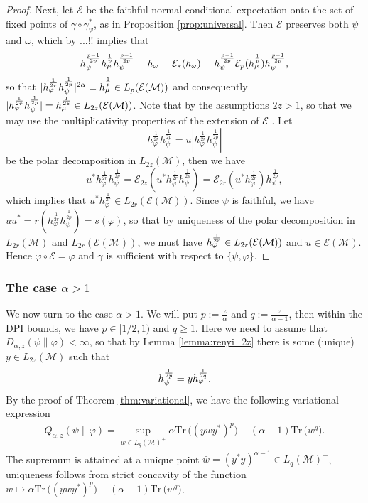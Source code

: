 \documentclass[12pt]{article}
\theoremstyle{definition}
\theoremstyle{remark}
\numberwithin{equation}{section}
\def\cE{\mathcal E}
\def\Me{\mathcal M}
\def \Tr{\mathrm{Tr}\,}
\def\ffi{\varphi}
\begin{document}
\begin{proof}
Next, let $\mathcal E$ be the faithful  normal conditional expectation onto the
set of fixed points of $\gamma\circ\gamma^*_\psi$, as in Proposition \ref{prop:universal}. Then
$\mathcal E$ preserves both $\psi$ and $\omega$, which by
\cite{junge2003noncommutative} {\color{red}...!!}  implies that 
\[
h_\psi^{p-1\over 2p}h_\mu^{\frac1p}h_\psi^{p-1\over 2p}=h_\omega=\mathcal
E_*(h_\omega)=h_\psi^{p-1\over 2p}\cE_p(h_\mu^{\frac1p})h_\psi^{p-1\over 2p},
\]
so that $|h_\ffi^{1\over 2r}h_\psi^{1\over 2p}|^{2\alpha}= h_\mu^{\frac1p}\in
L_p(\cE(\Me))$ and consequently $|h_\varphi^{\frac1{2r}}h_\psi^{\frac1{2p}}|=h_\mu^{1\over
2z}\in L_{2z}(\mathcal E(\Me))$.
Note that by the assumptions $2z>1$, so that we may use the multiplicativity properties
of the extension of $\mathcal E$ \cite{junge2003noncommutative}. Let 
\[
h_\varphi^{\frac1{2r}}h_\psi^{\frac1{2p}}=u|h_\varphi^{\frac1{2r}}h_\psi^{\frac1{2p}}|
\]
be the polar decomposition in $L_{2z}(\Me)$, then we have 
\[
u^*h_\varphi^{\frac1{2r}}h_\psi^{\frac1{2p}}=\mathcal
E_{2z}(u^*h_\varphi^{\frac1{2r}}h_\psi^{\frac1{2p}})=\mathcal
E_{2r}(u^*h_\varphi^{\frac1{2r}})h_\psi^{\frac1{2p}},
\]
which implies that $u^*h_\varphi^{\frac1{2r}}\in L_{2r}(\cE(\Me))$. Since $\psi$ is
faithful, we have $uu^*=r(h_\varphi^{\frac1{2r}}h_\psi^{\frac1{2p}})=s(\ffi)$, so that by uniqueness of the polar decomposition in
$L_{2r}(\Me)$ and $L_{2r}(\cE(\Me))$, we
must have $h_\ffi^{1\over 2r}\in L_{2r}(\cE(\Me))$ and $u\in \cE(\Me)$.
Hence $\ffi\circ\mathcal E=\ffi$ and $\gamma$ is sufficient with respect to
$\{\psi,\varphi\}$. 

\end{proof}


\subsubsection{The case $\alpha>1$}

We now turn to the case $\alpha>1$. We will put $p:=\frac z\alpha$ and
$q:=\frac z{\alpha-1}$, then within the DPI bounds, we have $p\in [1/2,1)$ and $q\ge 1$. Here we need to assume that
$D_{\alpha,z}(\psi\|\ffi)<\infty$, so that by Lemma \ref{lemma:renyi_2z} there is some
(unique)  $y\in L_{2z}(\Me)$ such that
\[
h_{\psi}^{1\over 2p}=y h_\ffi^{1\over 2q}.
\]
By the proof of Theorem \ref{thm:variational}, we have the following variational
expression
\begin{align}\label{eq:variationalq}
Q_{\alpha,z}(\psi\|\varphi) =\sup_{w\in
L_q(\Me)^+}\alpha\Tr\bigl((ywy^*)^p\bigr)-(\alpha-1)\Tr \bigl(w^q\bigr).
\end{align}
 The supremum is attained at a unique point $\bar
w=(y^*y)^{\alpha-1}\in L_q(\Me)^+$, uniqueness follows from strict concavity of the
function $w\mapsto \alpha\Tr\bigl((ywy^*)^p\bigr)-(\alpha-1)\Tr\bigl( w^q\bigr)$.
\end{document}
